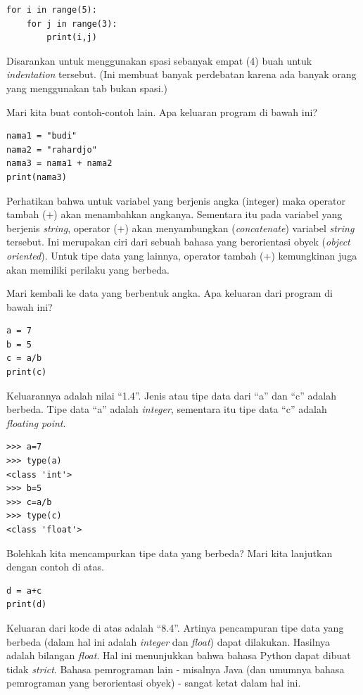 \begin{verbatim}
for i in range(5):
    for j in range(3):
        print(i,j)
\end{verbatim}

Disarankan untuk menggunakan spasi sebanyak empat (4) buah untuk {\em
indentation} tersebut. (Ini membuat banyak perdebatan karena ada banyak orang
yang menggunakan tab bukan spasi.)

Mari kita buat contoh-contoh lain. Apa keluaran program di bawah ini?
\begin{verbatim}
nama1 = "budi"
nama2 = "rahardjo"
nama3 = nama1 + nama2
print(nama3)
\end{verbatim}

Perhatikan bahwa untuk variabel yang berjenis angka (integer) maka operator 
tambah (+) akan menambahkan angkanya. Sementara itu pada variabel yang
berjenis {\em string}, operator (+) akan menyambungkan ({\em concatenate})
variabel {\em string} tersebut.
Ini merupakan ciri dari sebuah bahasa yang berorientasi obyek
({\em object oriented}).
Untuk tipe data yang lainnya, operator tambah (+) kemungkinan juga akan
memiliki perilaku yang berbeda.

Mari kembali ke data yang berbentuk angka. Apa keluaran dari program
di bawah ini?
\begin{verbatim}
a = 7
b = 5
c = a/b
print(c)
\end{verbatim}

Keluarannya adalah nilai ``1.4''. Jenis atau tipe data dari ``a'' dan ``c''
adalah berbeda. Tipe data ``a'' adalah {\em integer}, sementara itu
tipe data ``c'' adalah {\em floating point}.

\begin{verbatim}
>>> a=7
>>> type(a)
<class 'int'>
>>> b=5
>>> c=a/b
>>> type(c)
<class 'float'>
\end{verbatim}

Bolehkah kita mencampurkan tipe data yang berbeda?
Mari kita lanjutkan dengan contoh di atas.
\begin{verbatim}
d = a+c
print(d)
\end{verbatim}
Keluaran dari kode di atas adalah ``8.4''. Artinya pencampuran tipe data
yang berbeda (dalam hal ini adalah {\em integer} dan {\em float}) dapat
dilakukan. Hasilnya adalah bilangan {\em float}.
Hal ini menunjukkan bahwa bahasa Python dapat dibuat tidak {\em strict}.
Bahasa pemrograman lain - misalnya Java (dan umumnya bahasa pemrograman
yang berorientasi obyek) - sangat ketat dalam hal ini.


